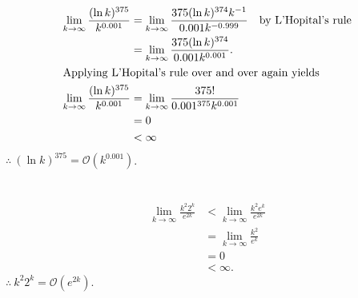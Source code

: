 \documentclass[
  coursecode={MTHE 418},
  assignmentname={Homework \homeworknumber},
  studentnumber=20053722,
  name={Bryan Hoang},
  draft,
  final,
]{
  ltxanswer%
}
\date{2022-02-28}
\begin{document}
  \begin{questions}
    \setcounter{question}{\questionnumber}
    \addtocounter{question}{-1}
    \question[10]\
    \begin{parts}
      \setcounter{partno}{3}
      \part{}
      \begin{solution}
        \begin{align*}
          \lim_{k\to\infty} \frac{(\ln k)^{375}}{k^{0.001}} &= \lim_{k\to\infty} \frac{375 (\ln k)^{374} k^{-1}}{0.001 k^{-0.999}} & &\text{by L'Hopital's rule} \\
                                                            &= \lim_{k\to\infty} \frac{375 (\ln k)^{374}}{0.001 k^{0.001}}.                                      \\
          \intertext{Applying L'Hopital's rule over and over again yields}
          \lim_{k\to\infty} \frac{(\ln k)^{375}}{k^{0.001}} &= \lim_{k\to\infty} \frac{375!}{0.001^{375} k^{0.001}}                                              \\
                                                            &= 0                                                                                                 \\
                                                            &< \infty
        \end{align*}
        \(\therefore\ (\ln k)^{375} = \mathcal{O}(k^{0.001})\).
      \end{solution}

      \part{}
      \begin{solution}
        \begin{align*}
          \lim_{k\to\infty} \frac{k^{2} 2^{k}}{e^{2k}} &< \lim_{k\to\infty} \frac{k^{2} e^{k}}{e^{2k}} \\
                                                       &= \lim_{k\to\infty} \frac{k^{2}}{e^{k}}        \\
                                                       &= 0                                            \\
                                                       &< \infty.
        \end{align*}
        \(\therefore\ k^{2} 2^{k} = \mathcal{O}(e^{2k})\).
      \end{solution}


\end{parts}
\end{questions}
\end{document}
